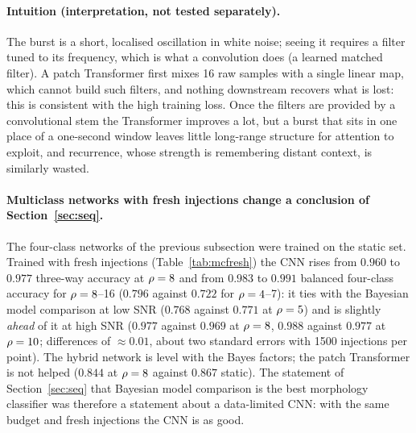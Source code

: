\paragraph{Intuition (interpretation, not tested separately).} The burst is a short, localised oscillation in white noise; seeing it requires a filter tuned to its frequency, which is what a convolution does (a learned matched filter). A patch Transformer first mixes 16 raw samples with a single linear map, which cannot build such filters, and nothing downstream recovers what is lost: this is consistent with the high training loss. Once the filters are provided by a convolutional stem the Transformer improves a lot, but a burst that sits in one place of a one-second window leaves little long-range structure for attention to exploit, and recurrence, whose strength is remembering distant context, is similarly wasted.

\paragraph{Multiclass networks with fresh injections change a conclusion of Section~\ref{sec:seq}.} The four-class networks of the previous subsection were trained on the static set. Trained with fresh injections (Table~\ref{tab:mcfresh}) the CNN rises from $0.960$ to $0.977$ three-way accuracy at $\rho=8$ and from $0.983$ to $0.991$ balanced four-class accuracy for $\rho=8$--16 ($0.796$ against $0.722$ for $\rho=4$--7): it ties with the Bayesian model comparison at low SNR ($0.768$ against $0.771$ at $\rho=5$) and is slightly \emph{ahead} of it at high SNR ($0.977$ against $0.969$ at $\rho=8$, $0.988$ against $0.977$ at $\rho=10$; differences of $\approx0.01$, about two standard errors with 1500 injections per point). The hybrid network is level with the Bayes factors; the patch Transformer is not helped ($0.844$ at $\rho=8$ against $0.867$ static). The statement of Section~\ref{sec:seq} that Bayesian model comparison is the best morphology classifier was therefore a statement about a data-limited CNN: with the same budget and fresh injections the CNN is as good.

